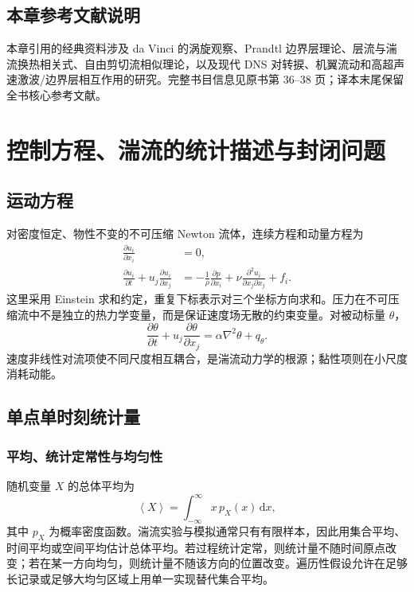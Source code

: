 \documentclass[12pt,a4paper,openany,fontset=none]{ctexbook}
\newcommand{\dd}{\,\mathrm d}
\newcommand{\avg}[1]{\left\langle #1\right\rangle}
\begin{document}
\section*{本章参考文献说明}
本章引用的经典资料涉及 da Vinci 的涡旋观察、Prandtl 边界层理论、层流与湍流换热相关式、自由剪切流相似理论，以及现代 DNS 对转捩、机翼流动和高超声速激波/边界层相互作用的研究。完整书目信息见原书第 36--38 页；译本末尾保留全书核心参考文献。
\chapter{控制方程、湍流的统计描述与封闭问题}

\section{运动方程}

对密度恒定、物性不变的不可压缩 Newton 流体，连续方程和动量方程为
\begin{align}
 \frac{\partial u_i}{\partial x_i}&=0,\\
 \frac{\partial u_i}{\partial t}+u_j\frac{\partial u_i}{\partial x_j}
 &=-\frac{1}{\rho}\frac{\partial p}{\partial x_i}
   +\nu\frac{\partial^2u_i}{\partial x_j\partial x_j}+f_i.
\end{align}
这里采用 Einstein 求和约定，重复下标表示对三个坐标方向求和。压力在不可压缩流中不是独立的热力学变量，而是保证速度场无散的约束变量。对被动标量 $\theta$，
\begin{equation}
 \frac{\partial\theta}{\partial t}+u_j\frac{\partial\theta}{\partial x_j}
 =\alpha\nabla^2\theta+q_\theta.
\end{equation}
速度非线性对流项使不同尺度相互耦合，是湍流动力学的根源；黏性项则在小尺度消耗动能。

\section{单点单时刻统计量}

\subsection{平均、统计定常性与均匀性}

随机变量 $X$ 的总体平均为
\begin{equation}
 \avg{X}=\int_{-\infty}^{\infty}x\,p_X(x)\dd x,
\end{equation}
其中 $p_X$ 为概率密度函数。湍流实验与模拟通常只有有限样本，因此用集合平均、时间平均或空间平均估计总体平均。若过程统计定常，则统计量不随时间原点改变；若在某一方向均匀，则统计量不随该方向的位置改变。遍历性假设允许在足够长记录或足够大均匀区域上用单一实现替代集合平均。
\end{document}
